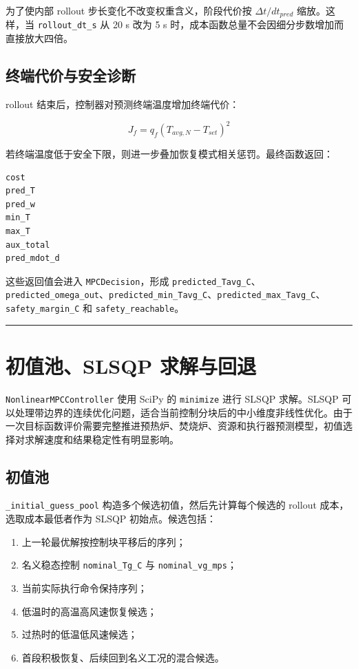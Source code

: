 \documentclass[UTF8,openany,zihao=-4,oneside]{ctexbook}
\providecommand{\tightlist}{\setlength{\itemsep}{0pt}\setlength{\parskip}{0pt}}
\providecommand{\passthrough}[1]{#1}
\newcommand{\manualdivider}{\par\vspace{0.6em}\noindent\textcolor{FGLine}{\rule{\linewidth}{0.7pt}}\vspace{0.6em}\par}
\begin{document}
为了使内部 rollout 步长变化不改变权重含义，阶段代价按 \(\Delta t / dt_{pred}\) 缩放。这样，当 \passthrough{\lstinline!rollout_dt_s!} 从 20 s 改为 5 s 时，成本函数总量不会因细分步数增加而直接放大四倍。

\subsection{终端代价与安全诊断}\label{subsec:terminal-cost-impl}

rollout 结束后，控制器对预测终端温度增加终端代价：

\[
J_f=q_f\left(T_{avg,N}-T_{set}\right)^2
\]

若终端温度低于安全下限，则进一步叠加恢复模式相关惩罚。最终函数返回：

\begin{lstlisting}
cost
pred_T
pred_w
min_T
max_T
aux_total
pred_mdot_d
\end{lstlisting}

这些返回值会进入 \passthrough{\lstinline!MPCDecision!}，形成 \passthrough{\lstinline!predicted_Tavg_C!}、\passthrough{\lstinline!predicted_omega_out!}、\passthrough{\lstinline!predicted_min_Tavg_C!}、\passthrough{\lstinline!predicted_max_Tavg_C!}、\passthrough{\lstinline!safety_margin_C!} 和 \passthrough{\lstinline!safety_reachable!}。

\manualdivider

\section{初值池、SLSQP 求解与回退}\label{sec:nmpc-slsqp-fallback}

\passthrough{\lstinline!NonlinearMPCController!} 使用 SciPy 的 \passthrough{\lstinline!minimize!} 进行 SLSQP 求解。SLSQP 可以处理带边界的连续优化问题，适合当前控制分块后的中小维度非线性优化。由于一次目标函数评价需要完整推进预热炉、焚烧炉、资源和执行器预测模型，初值选择对求解速度和结果稳定性有明显影响。

\subsection{初值池}\label{subsec:nmpc-seed-pool}

\passthrough{\lstinline!_initial_guess_pool!} 构造多个候选初值，然后先计算每个候选的 rollout 成本，选取成本最低者作为 SLSQP 初始点。候选包括：

\begin{enumerate}
\def\labelenumi{\arabic{enumi}.}
\tightlist
\item
  上一轮最优解按控制块平移后的序列；
\item
  名义稳态控制 \passthrough{\lstinline!nominal_Tg_C!} 与 \passthrough{\lstinline!nominal_vg_mps!}；
\item
  当前实际执行命令保持序列；
\item
  低温时的高温高风速恢复候选；
\item
  过热时的低温低风速候选；
\item
  首段积极恢复、后续回到名义工况的混合候选。
\end{enumerate}
\end{document}
